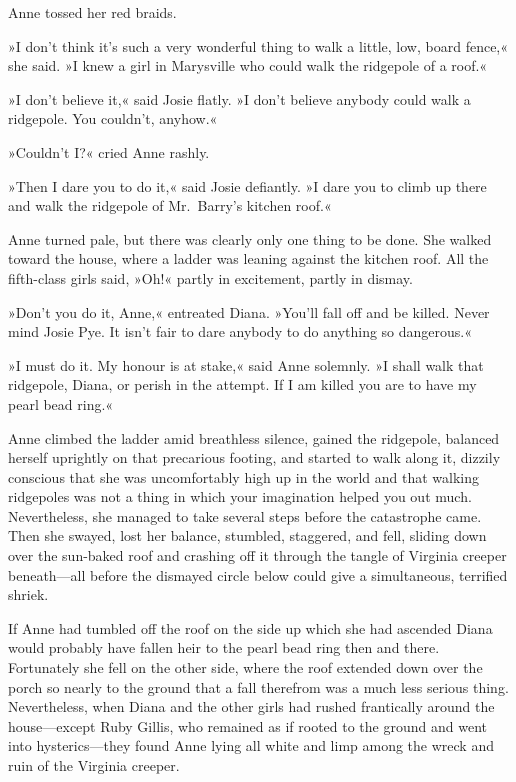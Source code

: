 Anne tossed her red braids.

»I don't think it's such a very wonderful thing to walk a little, low, board fence,« she said. »I knew a girl in Marysville who could walk the ridgepole of a roof.«

»I don't believe it,« said Josie flatly. »I don't believe anybody could walk a ridgepole. You couldn't, anyhow.«

»Couldn't I?« cried Anne rashly.

»Then I dare you to do it,« said Josie defiantly. »I dare you to climb up there and walk the ridgepole of Mr.~Barry's kitchen roof.«

Anne turned pale, but there was clearly only one thing to be done. She walked toward the house, where a ladder was leaning against the kitchen roof. All the fifth-class girls said, »Oh!« partly in excitement, partly in dismay.

»Don't you do it, Anne,« entreated Diana. »You'll fall off and be killed. Never mind Josie Pye. It isn't fair to dare anybody to do anything so dangerous.«

»I must do it. My honour is at stake,« said Anne solemnly. »I shall walk that ridgepole, Diana, or perish in the attempt. If I am killed you are to have my pearl bead ring.«

Anne climbed the ladder amid breathless silence, gained the ridgepole, balanced herself uprightly on that precarious footing, and started to walk along it, dizzily conscious that she was uncomfortably high up in the world and that walking ridgepoles was not a thing in which your imagination helped you out much. Nevertheless, she managed to take several steps before the catastrophe came. Then she swayed, lost her balance, stumbled, staggered, and fell, sliding down over the sun-baked roof and crashing off it through the tangle of Virginia creeper beneath—all before the dismayed circle below could give a simultaneous, terrified shriek.

If Anne had tumbled off the roof on the side up which she had ascended Diana would probably have fallen heir to the pearl bead ring then and there. Fortunately she fell on the other side, where the roof extended down over the porch so nearly to the ground that a fall therefrom was a much less serious thing. Nevertheless, when Diana and the other girls had rushed frantically around the house—except Ruby Gillis, who remained as if rooted to the ground and went into hysterics—they found Anne lying all white and limp among the wreck and ruin of the Virginia creeper.

